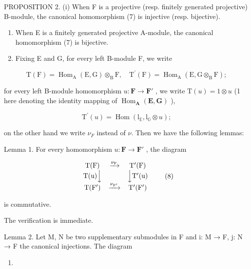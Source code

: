 PROPOSITION 2. (i) When F is a projective (resp. finitely generated projective) B-module, the canonical homomorphism (7) is injective (resp. bijective).

\begin{enumerate}
\def\labelenumi{(\roman{enumi})}
\setcounter{enumi}{1}
\item
  When E is a finitely generated projective A-module, the canonical homomorphism (7) is bijective.
\item
  Fixing E and G, for every left B-module F, we write
\end{enumerate}

\[
\mathrm{T} (\mathrm{F}) = \operatorname{Hom} _ {\mathrm{A}} (\mathrm{E}, \mathrm{G}) \otimes_ {\mathrm{B}} \mathrm{F}, \quad \mathrm{T} ^ {\prime} (\mathrm{F}) = \operatorname{Hom} _ {\mathrm{A}} (\mathrm{E}, \mathrm{G} \otimes_ {\mathrm{B}} \mathrm{F});
\]

for every left B-module homomorphism \(u: \mathbf{F} \to \mathbf{F}'\) , we write \(\mathrm{T}(u) = 1 \otimes u\) (1 here denoting the identity mapping of \(\operatorname{Hom}_{\mathbf{A}}(\mathbf{E}, \mathbf{G})\) ),

\[
\mathrm{T} ^ {\prime} (u) = \operatorname{Hom} \left(\mathrm{l} _ {\mathbb {E}}, \mathrm{l} _ {\mathbb {G}} \otimes u\right);
\]

on the other hand we write \(\nu_{F}\) instead of \(\nu\). Then we have the following lemmas:

Lemma 1. For every homomorphism \(u: \mathbf{F} \to \mathbf{F}'\) , the diagram

\[
\begin{array}{c c c} \mathrm{T(F)} & \xrightarrow {\nu_ {\mathrm{F}}} & \mathrm {T^ {\prime} (F)} \\ \mathrm{T(u)} \Big \downarrow & & \Big \downarrow \mathrm {T^ {\prime} (u)} \\ \mathrm {T(F^ {\prime})} & \xrightarrow {\nu_ {\mathrm {F^ {\prime}}}} & \mathrm {T^ {\prime} (F^ {\prime})} \end{array}\tag{8}
\]

is commutative.

The verification is immediate.

Lemma 2. Let M, N be two supplementary submodules in F and i: M → F, j: N → F the canonical injections. The diagram

\begin{enumerate}
\def\labelenumi{(\arabic{enumi})}
\setcounter{enumi}{8}
\tightlist
\item
\end{enumerate}

